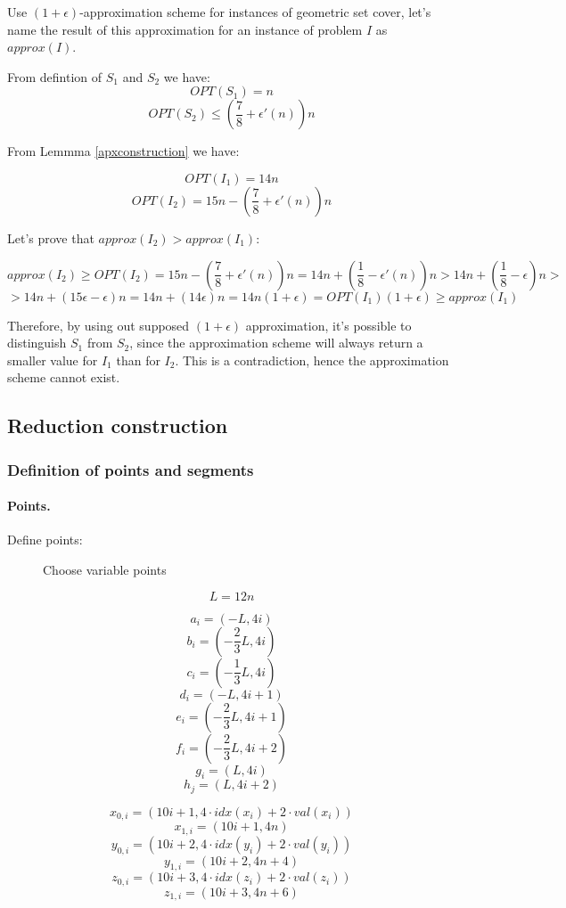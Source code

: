 Use $(1+\epsilon)$-approximation scheme for instances of geometric
set cover, let's name the result of this approximation
for an instance of problem $I$ as $approx(I)$.

From defintion of $S_1$ and $S_2$ we have:
$$OPT(S_1) = n$$
$$OPT(S_2) \le (\frac{7}{8} + \epsilon'(n))n$$

From Lemmma \ref{apxconstruction} we have:

$$OPT(I_1) = 14n$$
$$OPT(I_2) = 15n - (\frac{7}{8} + \epsilon'(n))n$$

Let's prove that $approx(I_2) > approx(I_1)$:

$$approx(I_2) \ge OPT(I_2) = 15n - (\frac{7}{8} + \epsilon'(n))n
	= 14n + (\frac{1}{8} - \epsilon'(n))n
	> 14n + (\frac{1}{8} - \epsilon)n > $$
$$	> 14n + (15\epsilon - \epsilon)n
	= 14n + (14\epsilon)n
	= 14n(1+\epsilon)
	= OPT(I_1)(1+\epsilon) \ge approx(I_1)$$ 



Therefore, by using out supposed $(1+\epsilon)$ approximation,
it’s possible to distinguish $S_1$ from $S_2$, since
the approximation scheme will always return a smaller value
for $I_1$ than for $I_2$. This is a contradiction,
hence the approximation scheme cannot exist.

\subsection{Reduction construction}
\subsubsection{Definition of points and segments}

\paragraph{Points.}

Define points:
\begin{figure}[h]
\centering
\def\svgwidth{0.5\columnwidth}

\caption{Choose variable points}
\label{fig:apx_choose_variable}
\end{figure}

	$$L = 12n$$


	$$a_{i} = (-L, 4i)$$
	$$b_{i} = (-\frac{2}{3}L, 4i)$$
	$$c_{i} = (-\frac{1}{3}L, 4i)$$
	$$d_{i} = (-L, 4i+1)$$
	$$e_{i} = (-\frac{2}{3}L, 4i+1)$$
	$$f_{i} = (-\frac{2}{3}L, 4i+2)$$
	$$g_i = (L, 4i)$$
	$$h_j = (L, 4i+2)$$
	
	$$x_{0, i} = (10i+1, 4\cdot idx(x_i) + 2\cdot val(x_i))$$
	$$x_{1, i} = (10i+1, 4n)$$
	$$y_{0, i} = (10i+2, 4\cdot idx(y_i) + 2\cdot val(y_i))$$
	$$y_{1, i} = (10i+2, 4n + 4)$$	
	$$z_{0, i} = (10i+3, 4\cdot idx(z_i) + 2\cdot val(z_i))$$
	$$z_{1, i} = (10i+3, 4n + 6)$$
	
